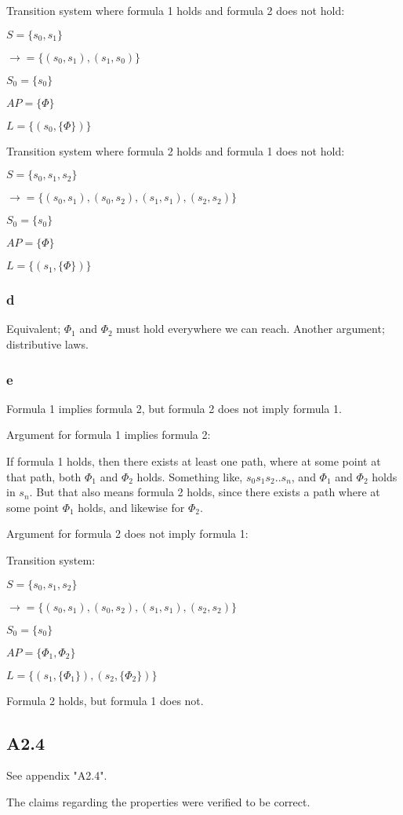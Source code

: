 Transition system where formula 1 holds and formula 2 does not hold:

$S = \{s_0, s_1\}$

$\rightarrow = \{
  (s_0, s_1), (s_1, s_0)
\}$

$S_0 = \{s_0\}$

$AP = \{\Phi\}$

$L = \{
  (s_0, \{\Phi\})
\}$

Transition system where formula 2 holds and formula 1 does not hold:

$S = \{s_0, s_1, s_2\}$

$\rightarrow = \{
  (s_0, s_1), (s_0, s_2),
  (s_1, s_1),
  (s_2, s_2)
\}$

$S_0 = \{s_0\}$

$AP = \{\Phi\}$

$L = \{
  (s_1, \{\Phi\})
\}$

\subsubsection{d}

Equivalent; $\Phi_1$ and $\Phi_2$ must hold everywhere we can reach.
Another argument; distributive laws.

\subsubsection{e}

Formula 1 implies formula 2, but formula 2 does not imply formula 1.

Argument for formula 1 implies formula 2:

If formula 1 holds, then there exists at least one path,
where at some point at that path, both $\Phi_1$ and $\Phi_2$ holds.
Something like, $s_0s_1s_2..s_n$, and $\Phi_1$ and $\Phi_2$ holds in $s_n$.
But that also means formula 2 holds, since there exists a path
where at some point $\Phi_1$ holds, and likewise for $\Phi_2$.

Argument for formula 2 does not imply formula 1:

Transition system:

$S = \{s_0, s_1, s_2\}$

$\rightarrow = \{
  (s_0, s_1), (s_0, s_2),
  (s_1, s_1),
  (s_2, s_2)
\}$

$S_0 = \{s_0\}$

$AP = \{\Phi_1, \Phi_2\}$

$L = \{
  (s_1, \{\Phi_1\}),
  (s_2, \{\Phi_2\})
\}$

Formula 2 holds, but formula 1 does not.

\subsection{A2.4}

See appendix "A2.4".

The claims regarding the properties were verified to be correct.

